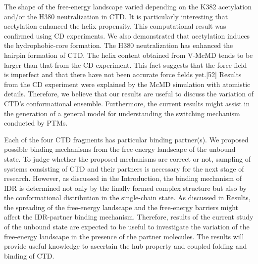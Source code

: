 The shape of the free-energy landscape varied depending on the K382 acetylation and/or the H380 neutralization in CTD. 
It is particularly interesting that acetylation enhanced the helix propensity. This computational result was confirmed using CD experiments. 
We also demonstrated that acetylation induces the hydrophobic-core formation. The H380 neutralization has enhanced the hairpin formation of CTD. 
The helix content obtained from V-McMD tends to be larger than that from the CD experiment. 
This fact suggests that the force field is imperfect and that there have not been accurate force fields yet.[52] Results from the CD experiment were explained by the McMD simulation with atomistic details. 
Therefore, we believe that our results are useful to discuss the variation of CTD’s conformational ensemble. 
Furthermore, the current results might assist in the generation of a general model for understanding the switching mechanism conducted by PTMs.

Each of the four CTD fragments has particular binding partner(s). 
We proposed possible binding mechanisms from the free-energy landscape of the unbound state. 
To judge whether the proposed mechanisms are correct or not, sampling of systems consisting of CTD and their partners is necessary for the next stage of research. 
However, as discussed in the Introduction, the binding mechanism of IDR is determined not only by the finally formed complex structure but also by the conformational distribution in the single-chain state. 
As discussed in Results, the spreading of the free-energy landscape and the free-energy barriers might affect the IDR-partner binding mechanism. 
Therefore, results of the current study of the unbound state are expected to be useful to investigate the variation of the free-energy landscape in the presence of the partner molecules. 
The results will provide useful knowledge to ascertain the hub property and coupled folding and binding of CTD.